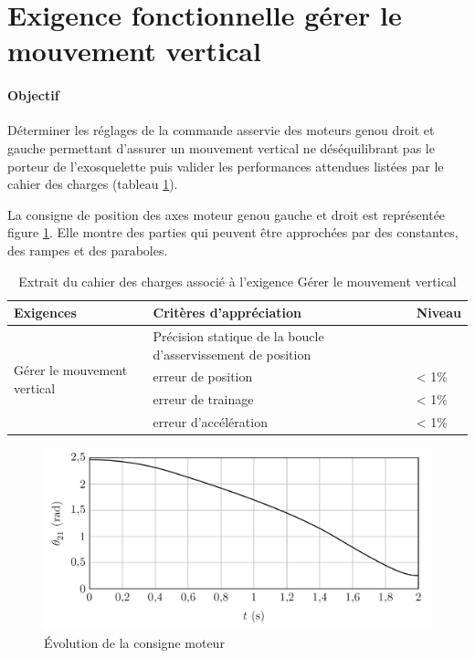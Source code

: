 \section{Exigence fonctionnelle \og gérer le mouvement vertical \fg}

\paragraph{Objectif}

Déterminer les réglages de la commande asservie des moteurs genou droit et gauche permettant d'assurer un mouvement vertical ne déséquilibrant pas le porteur de l'exosquelette puis valider les performances attendues listées par le cahier des charges (tableau \ref{tab02}).

La consigne de position des axes moteur genou gauche et droit est représentée figure \ref{img06}. Elle montre des parties qui peuvent être approchées par des constantes, des rampes et des paraboles.

\begin{table}[!h]
\begin{tabular}{|l|l|l|}
\hline
Exigences & Critères d'appréciation & Niveau \\
\hline
\multirow{4}{*}{Gérer le mouvement vertical} & Précision statique de la boucle d'asservissement de position & 
 \\
& erreur de position & < 1\% \\
& erreur de trainage & < 1\% \\
& erreur d'accélération & < 1\% \\
\hline
\end{tabular}
 \caption{Extrait du cahier des charges associé à l'exigence \og Gérer le mouvement vertical \fg}
 \label{tab02}
\end{table}

\begin{figure}[!h]
 \centering\includegraphics[width=0.8\linewidth]{img/fig06}
 \caption{Évolution de la consigne moteur}
 \label{img06}
\end{figure}

